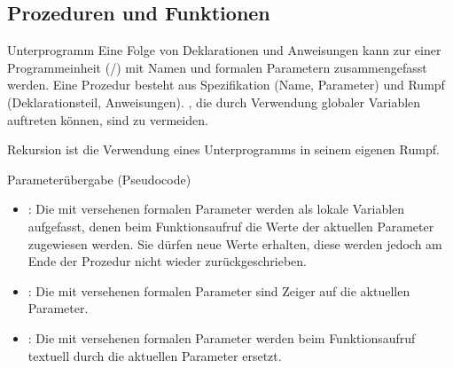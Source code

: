 \subsection{%
    Prozeduren und Funktionen%
}

\begin{Def}{Unterprogramm}
    Eine Folge von Deklarationen und Anweisungen kann zur einer Programmeinheit
    (/) mit Namen und formalen
    Parametern zusammengefasst werden.
    Eine Prozedur besteht aus Spezifikation (Name, Parameter) und Rumpf
    (Deklarationsteil, Anweisungen).
    , die durch Verwendung globaler Variablen auftreten
    können, sind zu vermeiden.
\end{Def}

\begin{Def}{Rekursion}
     ist die Verwendung eines Unterprogramms
    in seinem eigenen Rumpf.
\end{Def}

\begin{Def}{Parameterübergabe (Pseudocode)}
    \begin{itemize}
        \item {}: Die mit  versehenen
        formalen Parameter werden als lokale Variablen aufgefasst, denen beim
        Funktionsaufruf die Werte der aktuellen Parameter zugewiesen werden.
        Sie dürfen neue Werte erhalten, diese werden jedoch am Ende der
        Prozedur nicht wieder zurückgeschrieben.
        
        \item {}: Die mit  versehenen
        formalen Parameter sind Zeiger auf die aktuellen Parameter.
        
        \item {}: Die mit  versehenen
        formalen Parameter werden beim Funktionsaufruf textuell durch die
        aktuellen Parameter ersetzt.
    \end{itemize}
\end{Def}

